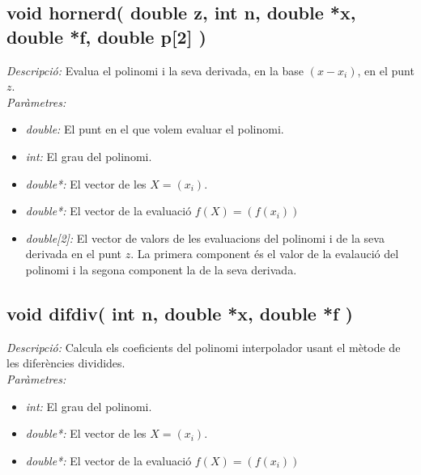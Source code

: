 \documentclass[a4paper,10pt, notitlepage]{article}
\begin{document}
\subsection{void hornerd( double z, int n, double *x, double *f, double p[2] )}
\textit{Descripció: }
  Evalua el polinomi i la seva derivada, en la base $(x-x_i)$, en el punt $z$.
\\\textit{Paràmetres: }\begin{itemize}[label={--}]
  \item \textit{double: } El punt en el que volem evaluar el polinomi.
  \item \textit{int: } El grau del polinomi.
  \item \textit{double*: } El vector de les $X = (x_i)$.
  \item \textit{double*: } El vector de la evaluació $f(X) = ( f(x_i) )$
  \item \textit{double[2]: } El vector de valors de les evaluacions del polinomi i de la seva derivada en el punt $z$. La primera component és el valor de la evalaució del polinomi i la segona component la de la seva derivada.
\end{itemize}



\subsection{void difdiv( int n, double *x, double *f )}
\textit{Descripció: }
  Calcula els coeficients del polinomi interpolador usant el mètode de les diferències dividides.
\\\textit{Paràmetres: }\begin{itemize}[label={--}]
  \item \textit{int: } El grau del polinomi.
  \item \textit{double*: } El vector de les $X = (x_i)$.
  \item \textit{double*: } El vector de la evaluació $f(X) = ( f(x_i) )$
\end{itemize}
\end{document}
